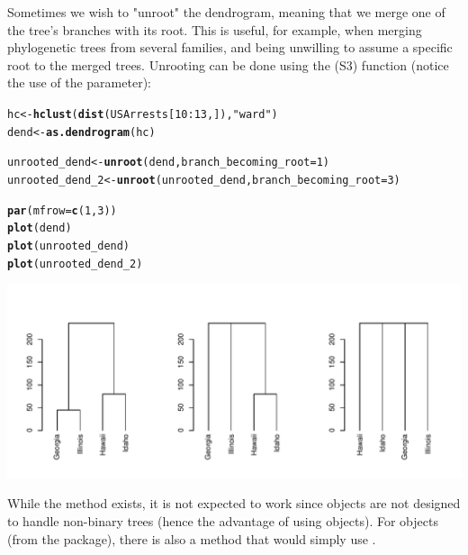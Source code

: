 \documentclass[shortnames,nojss,article]{jss}\usepackage{graphicx, color}
\makeatletter
\def\maxwidth{ %
  \ifdim\Gin@nat@width>\linewidth
    \linewidth
  \else
    \Gin@nat@width
  \fi
}
\newcommand{\hlfunctioncall}[1]{\textcolor[rgb]{0.501960784313725,0,0.329411764705882}{\textbf{#1}}}%
\newcommand{\hlstring}[1]{\textcolor[rgb]{0.6,0.6,1}{#1}}%
\newenvironment{kframe}{%
 \def\at@end@of@kframe{}%
 \ifinner\ifhmode%
  \def\at@end@of@kframe{\end{minipage}}%
  \begin{minipage}{\columnwidth}%
 \fi\fi%
 \def\FrameCommand##1{\hskip\@totalleftmargin \hskip-\fboxsep
 \colorbox{shadecolor}{##1}\hskip-\fboxsep
     \hskip-\linewidth \hskip-\@totalleftmargin \hskip\columnwidth}%
 \MakeFramed {\advance\hsize-\width
   \@totalleftmargin\z@ \linewidth\hsize
   \@setminipage}}%
 {\par\unskip\endMakeFramed%
 \at@end@of@kframe}
\newenvironment{knitrout}{}{} %
\makeatother
\begin{document}
Sometimes we wish to "unroot" the dendrogram, meaning that we merge one of the tree's branches with its root. This is useful, for example, when merging phylogenetic trees from several families, and being unwilling to assume a specific root to the merged trees. Unrooting can be done using the  (S3) function (notice the use of the  parameter):


\begin{knitrout}
\color{fgcolor}\begin{kframe}
\begin{alltt}

hc <- \hlfunctioncall{hclust}(\hlfunctioncall{dist}(USArrests[10:13, ]), \hlstring{"ward"})
dend <- \hlfunctioncall{as.dendrogram}(hc)

unrooted_dend <- \hlfunctioncall{unroot}(dend, branch_becoming_root = 1)
unrooted_dend_2 <- \hlfunctioncall{unroot}(unrooted_dend, branch_becoming_root = 3)

\hlfunctioncall{par}(mfrow = \hlfunctioncall{c}(1, 3))
\hlfunctioncall{plot}(dend)
\hlfunctioncall{plot}(unrooted_dend)
\hlfunctioncall{plot}(unrooted_dend_2)
\end{alltt}
\end{kframe}

{\centering \includegraphics[width=\maxwidth]{figure/unnamed-chunk-24} 

}



\end{knitrout}


While the  method exists, it is not expected to work since  objects are not designed to handle non-binary trees (hence the advantage of using  objects). For  objects (from the  package), there is also a method that would simply use .
\end{document}
